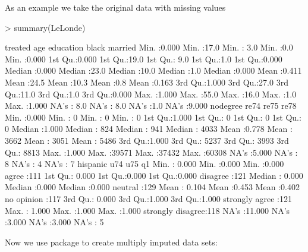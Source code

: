 \documentclass[article]{jss}
\begin{document}
As an example we take the original  data with missing values
\begin{Schunk}
\begin{Sinput}
> summary(LeLonde)
\end{Sinput}
\begin{Soutput}
    treated           age         education        black        married     
 Min.   :0.000   Min.   :17.0   Min.   : 3.0   Min.   :0.0   Min.   :0.000  
 1st Qu.:0.000   1st Qu.:19.0   1st Qu.: 9.0   1st Qu.:1.0   1st Qu.:0.000  
 Median :0.000   Median :23.0   Median :10.0   Median :1.0   Median :0.000  
 Mean   :0.411   Mean   :24.5   Mean   :10.3   Mean   :0.8   Mean   :0.163  
 3rd Qu.:1.000   3rd Qu.:27.0   3rd Qu.:11.0   3rd Qu.:1.0   3rd Qu.:0.000  
 Max.   :1.000   Max.   :55.0   Max.   :16.0   Max.   :1.0   Max.   :1.000  
                 NA's   : 8.0   NA's   : 8.0   NA's   :1.0   NA's   :9.000  
    nodegree          re74            re75            re78      
 Min.   :0.000   Min.   :    0   Min.   :    0   Min.   :    0  
 1st Qu.:1.000   1st Qu.:    0   1st Qu.:    0   1st Qu.:    0  
 Median :1.000   Median :  824   Median :  941   Median : 4033  
 Mean   :0.778   Mean   : 3662   Mean   : 3051   Mean   : 5486  
 3rd Qu.:1.000   3rd Qu.: 5237   3rd Qu.: 3993   3rd Qu.: 8813  
 Max.   :1.000   Max.   :39571   Max.   :37432   Max.   :60308  
 NA's   :5.000   NA's   :    8   NA's   :    4   NA's   :    7  
    hispanic           u74             u75                        q1     
 Min.   : 0.000   Min.   :0.000   Min.   :0.000   agree            :111  
 1st Qu.: 0.000   1st Qu.:0.000   1st Qu.:0.000   disagree         :121  
 Median : 0.000   Median :0.000   Median :0.000   neutral          :129  
 Mean   : 0.104   Mean   :0.453   Mean   :0.402   no opinion       :117  
 3rd Qu.: 0.000   3rd Qu.:1.000   3rd Qu.:1.000   strongly agree   :121  
 Max.   : 1.000   Max.   :1.000   Max.   :1.000   strongly disagree:118  
 NA's   :11.000   NA's   :3.000   NA's   :3.000   NA's             :  5  
\end{Soutput}
\end{Schunk}
Now we use  package \citep{HonKinBLa06} to create
multiply imputed data sets:
\end{document}
